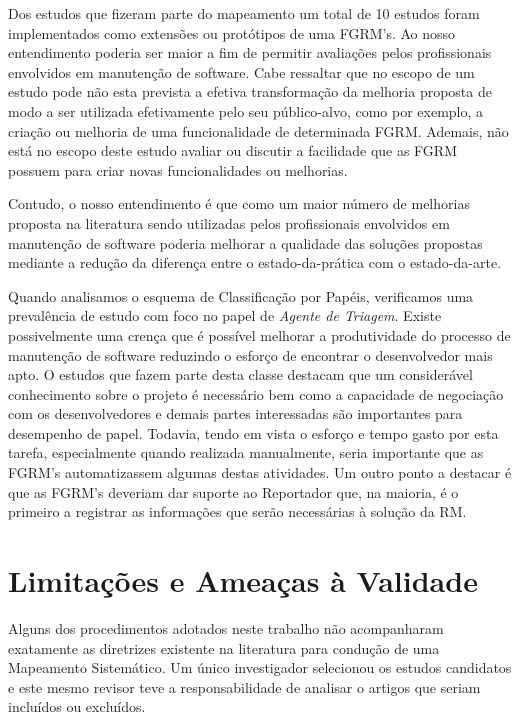 Dos estudos que fizeram parte do mapeamento um total de 10 estudos foram
implementados como extensões ou protótipos de uma FGRM's. Ao nosso entendimento
poderia ser maior a fim de permitir avaliações pelos profissionais envolvidos em
manutenção de software. Cabe ressaltar que no escopo de um estudo pode não esta
prevista a efetiva transformação da melhoria proposta de modo a ser utilizada
efetivamente pelo seu público-alvo, como por exemplo, a criação ou melhoria de
uma funcionalidade de determinada FGRM\@. Ademais, não está no escopo deste
estudo avaliar ou discutir a facilidade que as FGRM possuem para criar novas
funcionalidades ou melhorias.

Contudo, o nosso entendimento é que como um maior número de melhorias proposta
na literatura sendo utilizadas pelos profissionais envolvidos em manutenção de
software poderia melhorar a qualidade das soluções propostas mediante a redução
da diferença entre o estado-da-prática com o estado-da-arte.

Quando analisamos o esquema de Classificação por Papéis, verificamos uma
prevalência de estudo com foco no papel de \textit{Agente de Triagem}. Existe
possivelmente uma crença que é possível melhorar a produtividade do processo de
manutenção de software reduzindo o esforço de encontrar o desenvolvedor mais
apto. O estudos que fazem parte desta classe destacam que um considerável
conhecimento sobre o projeto é necessário bem como a capacidade de negociação
com os desenvolvedores e demais partes interessadas são importantes para
desempenho de papel. Todavia, tendo em vista o esforço e tempo gasto por esta
tarefa, especialmente quando realizada manualmente, seria importante que as
FGRM's automatizassem algumas destas atividades. Um outro ponto a destacar é que
as FGRM's deveriam dar suporte ao Reportador que, na maioria, é o primeiro a
registrar as informações que serão necessárias à solução da RM\@.

\section{Limitações e Ameaças à Validade}
\label{sec:map_limitacoes_ameacas}

Alguns dos procedimentos adotados neste trabalho não acompanharam exatamente as
diretrizes existente na literatura para condução de uma Mapeamento Sistemático.
Um único investigador selecionou os estudos candidatos e este mesmo revisor teve
a responsabilidade de analisar o artigos que seriam incluídos ou excluídos.

